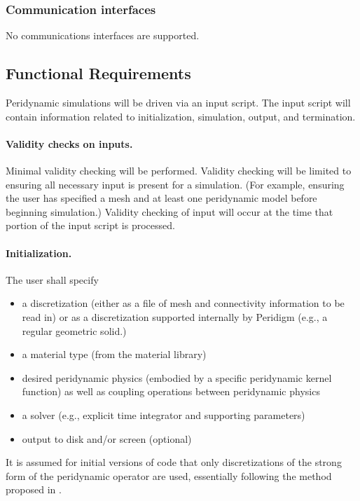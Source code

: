 \documentclass[10pt]{article}
\theoremstyle{plain}
\theoremstyle{definition}
\begin{document}
\subsubsection{Communication interfaces}

No communications interfaces are supported.

\subsection{Functional Requirements}

Peridynamic simulations will be driven via an input script.  The input script will contain information related to initialization, simulation, output, and termination.

\paragraph{Validity checks on inputs.}

Minimal validity checking will be performed. Validity checking will be limited to ensuring all necessary input is present for a simulation. (For example, ensuring the user has specified a mesh and at least one peridynamic model before beginning simulation.) Validity checking of input will occur at the time that portion of the input script is processed.

\paragraph{Initialization.}

The user shall specify
\begin{itemize}
  \item a discretization (either as a file of mesh and connectivity information to be read in) or as a discretization supported internally by Peridigm (e.g., a regular geometric solid.)
  \item a material type (from the material library)
  \item desired peridynamic physics (embodied by a specific peridynamic kernel function) as well as coupling operations between peridynamic physics
  \item a solver (e.g., explicit time integrator and supporting parameters)
  \item output to disk and/or screen (optional)
\end{itemize}

It is assumed for initial versions of code that only discretizations of the strong form of the peridynamic operator are used, essentially following the method proposed in \cite{Silling:2005:Meshfree}.
\end{document}
